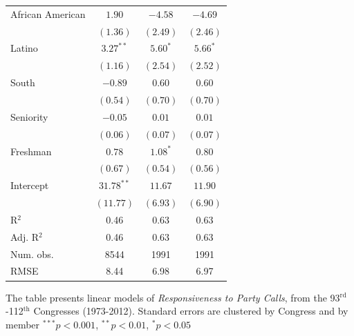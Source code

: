 \documentclass[12pt]{article}
\begin{document}
\begin{table}[!htbp]
\begin{threeparttable}
\begin{tabular}{l c c c }
African American      & $1.90$       & $-4.58$      & $-4.69$       \\
                      & $(1.36)$     & $(2.49)$     & $(2.46)$      \\
Latino                & $3.27^{**}$  & $5.60^{*}$   & $5.66^{*}$    \\
                      & $(1.16)$     & $(2.54)$     & $(2.52)$      \\
South                 & $-0.89$      & $0.60$       & $0.60$        \\
                      & $(0.54)$     & $(0.70)$     & $(0.70)$      \\
Seniority             & $-0.05$      & $0.01$       & $0.01$        \\
                      & $(0.06)$     & $(0.07)$     & $(0.07)$      \\
Freshman              & $0.78$       & $1.08^{*}$   & $0.80$        \\
                      & $(0.67)$     & $(0.54)$     & $(0.56)$      \\
Intercept             & $31.78^{**}$ & $11.67$      & $11.90$       \\
                      & $(11.77)$    & $(6.93)$     & $(6.90)$      \\
\hline
R$^2$                 & 0.46         & 0.63         & 0.63          \\
Adj. R$^2$            & 0.46         & 0.63         & 0.63          \\
Num. obs.             & 8544         & 1991         & 1991          \\
RMSE                  & 8.44         & 6.98         & 6.97          \\
\hline

\end{tabular}
\begin{tablenotes}
   \item
   The table presents linear models of \textit{Responsiveness to Party Calls},
   from the 93$^{\text{rd}}$-112$^{\text{th}}$ Congresses (1973-2012).
  Standard errors are clustered by Congress and by member
   $^{***}p<0.001$, $^{**}p<0.01$, $^*p<0.05$
 \end{tablenotes}
\end{threeparttable}
\end{table}
\end{document}
